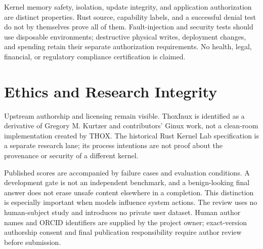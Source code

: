 \documentclass[11pt,a4paper]{article}
\begin{document}
Kernel memory safety, isolation, update integrity, and application authorization are distinct properties. Rust source, capability labels, and a successful denial test do not by themselves prove all of them. Fault-injection and security tests should use disposable environments; destructive physical writes, deployment changes, and spending retain their separate authorization requirements. No health, legal, financial, or regulatory compliance certification is claimed.

\section{Ethics and Research Integrity}
Upstream authorship and licensing remain visible. ThoxInux is identified as a derivative of Gregory M. Kurtzer and contributors' Ginux work, not a clean-room implementation created by THOX. The historical Rust Kernel Lab specification is a separate research lane; its process intentions are not proof about the provenance or security of a different kernel.

Published scores are accompanied by failure cases and evaluation conditions. A development gate is not an independent benchmark, and a benign-looking final answer does not erase unsafe content elsewhere in a completion. This distinction is especially important when models influence system actions. The review uses no human-subject study and introduces no private user dataset. Human author names and ORCID identifiers are supplied by the project owner; exact-version authorship consent and final publication responsibility require author review before submission.
\end{document}
